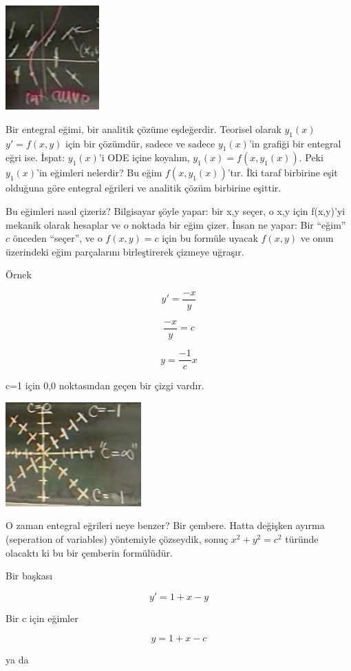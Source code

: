 \documentclass[12pt,fleqn]{article}\usepackage{../../common}
\begin{document}
\includegraphics[height=4cm]{./1_2.png}

Bir entegral eğimi, bir analitik çözüme eşdeğerdir. Teorisel olarak $y_1(x)$
$y'=f(x,y)$ için bir çözümdür, sadece ve sadece $y_1(x)$'in grafiği bir entegral
eğri ise. İspat: $y_1(x)$'i ODE içine koyalım, $y_1(x) = f(x,y_1(x))$. Peki
$y_1(x)$'in eğimleri nelerdir? Bu eğim $f(x,y_1(x))$'tır. İki taraf birbirine
eşit olduğuna göre entegral eğrileri ve analitik çözüm birbirine eşittir.

Bu eğimleri nasıl çizeriz? Bilgisayar şöyle yapar: bir x,y seçer, o x,y için
f(x,y)'yi mekanik olarak hesaplar ve o noktada bir eğim çizer. İnsan ne yapar:
Bir ``eğim'' $c$ önceden ``seçer'', ve o $f(x,y)=c$ için bu formüle uyacak
$f(x,y)$ ve onun üzerindeki eğim parçalarını birleştirerek çizmeye uğraşır.

Örnek 

$$ y' = \frac{-x}{y} $$

$$ \frac{-x}{y} = c $$

$$ y = \frac{-1}{c}x $$

c=1 için 0,0 noktasından geçen bir çizgi vardır.

\includegraphics[height=4cm]{./1_3.png}

O zaman entegral eğrileri neye benzer? Bir çembere. Hatta değişken ayırma
(seperation of variables) yöntemiyle çözseydik, sonuç $x^2+y^2=c^2$ türünde
olacaktı ki bu bir çemberin formülüdür.

Bir başkası

$$y' = 1+x-y$$

Bir c için eğimler

$$y = 1+x-c$$

ya da
\end{document}
